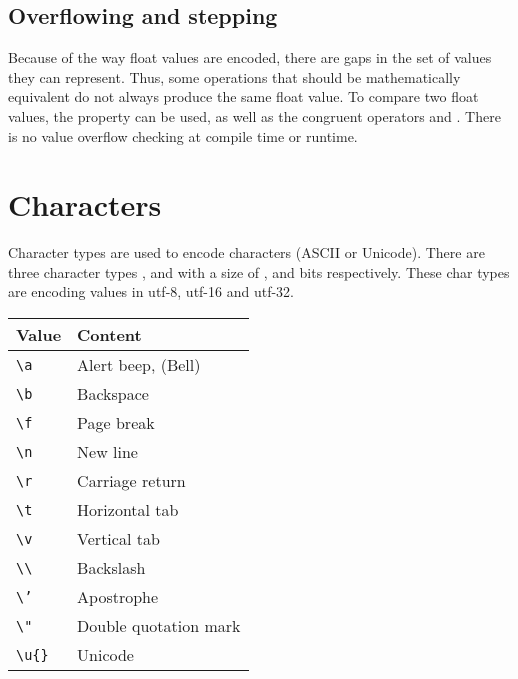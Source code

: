 \subsection{Overflowing and stepping}
\label{sec:orgd5d9f51}

Because of the way float values are encoded, there are gaps in the set of values
they can represent. Thus, some operations that should be mathematically
equivalent do not always produce the same float value. To compare two float
values, the property  can be used, as well as the congruent
operators \token{<=>} and \token{<!>}. There is no value overflow checking
at compile time or runtime.

\vfill%
\pagebreak

\section{Characters}
\label{sec:char_type}

Character types are used to encode characters (ASCII or Unicode). There are
three character types ,  and  with a size of
,  and  bits respectively. These char types are
encoding values in utf-8, utf-16 and utf-32.

\begin{center}
  \begin{tabular}{ll}
    Value & Content\\[0pt]
    \hline
    \texttt{\textbackslash{}a} & Alert beep, (Bell)\\[0pt]
    \texttt{\textbackslash{}b} & Backspace\\[0pt]
    \texttt{\textbackslash{}f} & Page break\\[0pt]
    \texttt{\textbackslash{}n} & New line\\[0pt]
    \texttt{\textbackslash{}r} & Carriage return\\[0pt]
    \texttt{\textbackslash{}t} & Horizontal tab\\[0pt]
    \texttt{\textbackslash{}v} & Vertical tab\\[0pt]
    \texttt{\textbackslash{}\textbackslash{}} & Backslash\\[0pt]
    \texttt{\textbackslash{}'} & Apostrophe\\[0pt]
    \texttt{\textbackslash{}"} & Double quotation mark\\[0pt]
    \texttt{\textbackslash{}u\{\}} & Unicode\\[0pt]
  \end{tabular}
\end{center}

